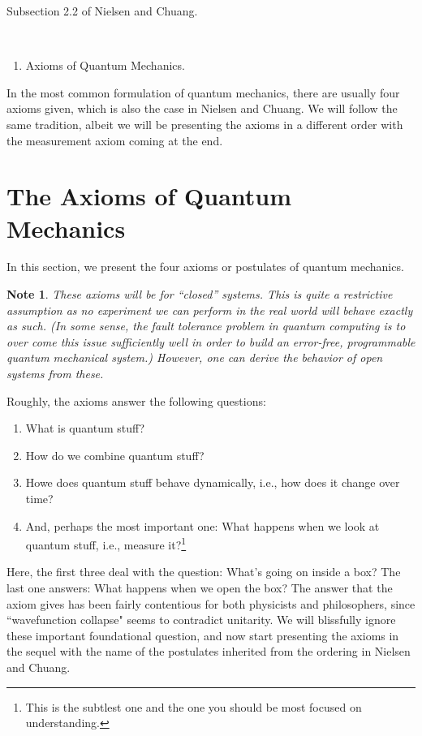 \documentclass{article}
\newtheorem*{note}{Note}
\begin{document}
\noindent
{}

\vspace{.3cm}

 Subsection 2.2 of Nielsen and Chuang. 

\

\begin{enumerate}
\item Axioms of Quantum Mechanics.
\end{enumerate}
In the most common formulation of quantum mechanics, there are usually four axioms given, which is also the case in Nielsen and Chuang. We will follow the same tradition, albeit we will be presenting the axioms in a different order with the measurement axiom coming at the end.

\section{The Axioms of Quantum Mechanics}
In this section, we present the four axioms or postulates of quantum mechanics.
\begin{note}
    These axioms will be for ``closed'' systems. This is quite a restrictive assumption as no experiment we can perform in the real world will behave exactly as such.  (In some sense, the fault tolerance problem in quantum computing is to over come this issue sufficiently well in order to build an error-free, programmable quantum mechanical system.) However, one can derive the behavior of open systems from these.
\end{note}
Roughly, the axioms answer the following questions:
\begin{enumerate}
    \item What is quantum stuff?
    \item How do we combine quantum stuff?
    \item Howe does quantum stuff behave dynamically, i.e., how does it change over time?
    \item And, perhaps the most important one: What happens when we look at quantum stuff, i.e., measure it?\footnote{This is the subtlest one and the one you should be most focused on understanding.}
\end{enumerate}
Here, the first three deal with the question: What's going on inside a box? The last one answers: What happens when we open the box? The answer that the axiom gives has been fairly contentious for both physicists and philosophers, since ``wavefunction collapse" seems to contradict unitarity.  We will blissfully ignore these important foundational question, and now start presenting the axioms in the sequel with the name of the postulates inherited from the ordering in Nielsen and Chuang.
\end{document}
